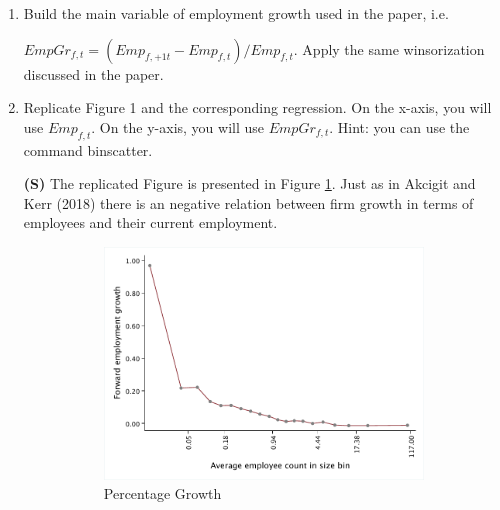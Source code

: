 \documentclass[12pt]{article}
\begin{document}
\begin{enumerate}[leftmargin=0pt, label=\textbf{(\alph*)}]

\item Build the main variable of employment growth used in the paper, i.e.

$E m p G r_{f, t}=\left(E m p_{f,+1 t}-E m p_{f, t}\right) / E m p_{f, t}$. Apply the same winsorization discussed in the paper.

\item Replicate Figure 1 and the corresponding regression. On the x-axis, you will use $E m p_{f, t}$. On the y-axis, you will use $E m p G r_{f, t}$. Hint: you can use the command binscatter.
\item[\textbf{(S)}] The replicated Figure is presented in Figure \ref{fig:growth_firm_size_1}. Just as in Akcigit and Kerr (2018) there is an negative relation between firm growth in terms of employees and their current employment. 
\begin{figure}[htb]
\caption{Employment Growth by Firm Size}
\label{fig:growth_firm_size}
\centering
     \begin{subfigure}[b]{0.48\textwidth}
         \centering
         \includegraphics[width=\textwidth]{Figures/Figure1b.pdf}
         \caption{Percentage Growth}
         \label{fig:growth_firm_size_1}
     \end{subfigure}
     \hfill
     \begin{subfigure}[b]{0.48\textwidth}
         \centering

\end{subfigure}
\end{figure}
\end{enumerate}
\end{document}
